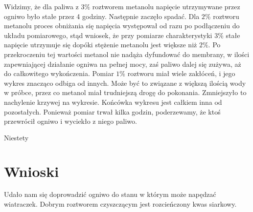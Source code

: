 \documentclass[a4paper,12pt]{article}
\begin{document}
Widzimy, że dla paliwa z $3\%$ roztworem metanolu napięcie utrzymywane przez ogniwo było stałe przez 4 godziny. Następnie zaczęło spadać. Dla $2\%$ roztworu metanolu proces obniżania się napięcia występował od razu po podłączeniu do układu pomiarowego, stąd wniosek, że przy pomiarze charakterystyki $3\%$ stałe napięcie utrzymuje się dopóki stężenie metanolu jest większe niż $2\%$. Po przekroczeniu tej wartości metanol nie nadąża dyfundować do membrany, w ilości zapewniającej działanie ogniwa na pełnej mocy, zaś paliwo dalej się zużywa, aż do całkowitego wykończenia. Pomiar $1\%$ roztworu miał wiele zakłóceń, i jego wykres znacząco odbiga od innych. Może być to związane z większą ilością wody w próbce, przez co metanol miał trudniejszą drogę do pokonania. Zmniejszyło to nachylenie krzywej na wykresie. Końcówka wykresu jest całkiem inna od pozostałych. Ponieważ pomiar trwał  kilka godzin, poderzewamy, że ktoś przewrócił ogniwo i wyciekło z niego paliwo.

Niestety 



\section{Wnioski}
Udało nam się doprowadzić ogniwo do stanu w którym może napędzać wiatraczek. Dobrym roztworem czyszczącym jest rozcieńczony kwas siarkowy.
\end{document}
